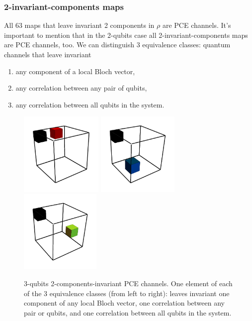 \documentclass[11pt,dvipsnames]{article} %
\newcommand{\1}{\mathds{1}}
\begin{document}
\subsubsection*{2-invariant-components maps}%
All 63 maps that leave invariant 2 components in $\rho$ are 
PCE channels. It's important to mention that in the 2-qubits case all 
2-invariant-components maps are PCE channels, too. We can distinguish
3 equivalence classes: quantum channels that leave invariant
\begin{enumerate}
	\item any component of a local Bloch vector,
	\item any correlation between any pair of qubits,
	\item any correlation between all qubits in the system.
\end{enumerate}
\begin{figure}[H]
	\centering
	\hfill \hfill
	\includegraphics[height=4cm]{img/3q-2c-1}
	\hfill
	\includegraphics[height=4cm]{img/3q-2c-2}
	\hfill
	\includegraphics[height=4cm]{img/3q-2c-3}
	\hfill \hfill
	\caption{3-qubits 2-components-invariant PCE channels. 
	One element of each of the 3 equivalence classes 
	(from left to right): leaves invariant one component of any local
	Bloch vector, one correlation between any pair or qubits, and 
	one correlation between all qubits in the system.}
	\label{fig:QC-3q-2c}
\end{figure}
\end{document}
